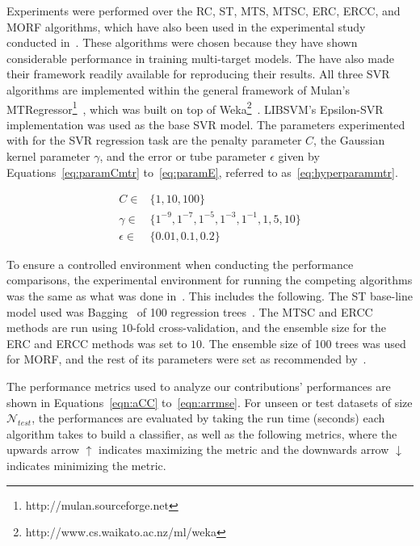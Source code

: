 \documentclass[reqno]{vcuthesis}
\numberwithin{equation}{chapter}
\begin{document}
Experiments were performed over the RC, ST, MTS, MTSC, ERC, ERCC, and MORF algorithms, which have also been used in the experimental study conducted in~\cite{Spyromitros2014}. These algorithms were chosen because they have shown considerable performance in training multi-target models. The have also made their framework readily available for reproducing their results. All three SVR algorithms are implemented within the general framework of Mulan's MTRegressor\footnote{http://mulan.sourceforge.net}~\cite{mulan}, which was built on top of Weka\footnote{http://www.cs.waikato.ac.nz/ml/weka}~\cite{Hall2009}. LIBSVM's Epsilon-SVR~\cite{CC01a} implementation was used as the base SVR model. The parameters experimented with for the SVR regression task are the penalty parameter $C$, the Gaussian kernel parameter $\gamma$, and the error or tube parameter $\epsilon$ given by Equations~\eqref{eq:paramCmtr} to~\eqref{eq:paramE}, referred to as~\eqref{eq:hyperparammtr}.

\begin{subequations}
\label{eq:hyperparammtr}
\begin{align}
C \in  & \{1, 10, 100\} \label{eq:paramCmtr}\\
\gamma \in  & \{1^{-9}, 1^{-7}, 1^{-5}, 1^{-3}, 1^{-1}, 1, 5, 10\} \label{eq:mtrparamG}\\
\epsilon \in  & \{0.01, 0.1, 0.2\} \label{eq:paramE}
\end{align}
\end{subequations}

To ensure a controlled environment when conducting the performance comparisons, the experimental environment for running the competing algorithms was the same as what was done in~\cite{Spyromitros2014}. This includes the following. The ST base-line model used was Bagging~\cite{Breiman1996} of 100 regression trees~\cite{Wu2015430}. The MTSC and ERCC methods are run using $10$-fold cross-validation, and the ensemble size for the ERC and ERCC methods was set to $10$. The ensemble size of 100 trees was used for MORF, and the rest of its parameters were set as recommended by~\cite{Kocev2013}.

The performance metrics used to analyze our contributions' performances are shown in Equations~\ref{eqn:aCC} to~\ref{eqn:arrmse}. For unseen or test datasets of size $\mathcal N_{test}$, the performances are evaluated by taking the run time (seconds) each algorithm takes to build a classifier, as well as the following metrics, where the upwards arrow $\uparrow$ indicates maximizing the metric and the downwards arrow $\downarrow$ indicates minimizing the metric.
\end{document}
